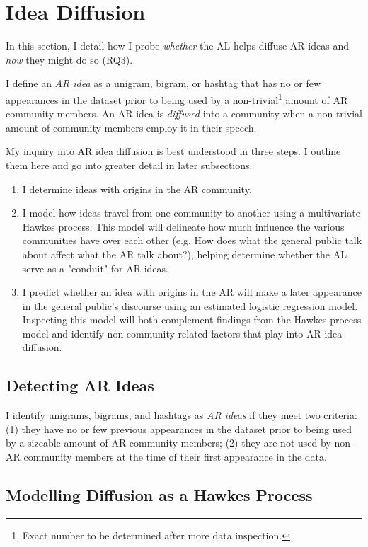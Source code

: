 \documentclass[acmlarge, screen, authorversion]{acmart}
\begin{document}
\section{Idea Diffusion}

In this section, I detail how I probe \textit{whether} the AL helps diffuse AR ideas and \textit{how} they might do so (RQ3). 

I define an \textit{AR idea} as a unigram, bigram, or hashtag that has no or few appearances in the dataset prior to being used by a non-trivial\footnote{Exact number to be determined after more data inspection.} amount of AR community members. An AR idea is \textit{diffused} into a community when a non-trivial amount of community members employ it in their speech.

My inquiry into AR idea diffusion is best understood in three steps. I outline them here and go into greater detail in later subsections.

\begin{enumerate}
    \item I determine ideas with origins in the AR community.
    \item I model how ideas travel from one community to another using a multivariate Hawkes process. This model will delineate how much influence the various communities have over each other (e.g. How does what the general public talk about affect what the AR talk about?), helping determine whether the AL serve as a "conduit" for AR ideas.
    \item I predict whether an idea with origins in the AR will make a later appearance in the general public's discourse using an estimated logistic regression model. Inspecting this model will both complement findings from the Hawkes process model and identify non-community-related factors that play into AR idea diffusion.
\end{enumerate}

\subsection{Detecting AR Ideas}

I identify unigrams, bigrams, and hashtags as \textit{AR ideas} if they meet two criteria: (1) they have no or few previous appearances in the dataset prior to being used by a sizeable amount of AR community members; (2) they are not used by non-AR community members at the time of their first appearance in the data.

\subsection{Modelling Diffusion as a Hawkes Process}
\end{document}
